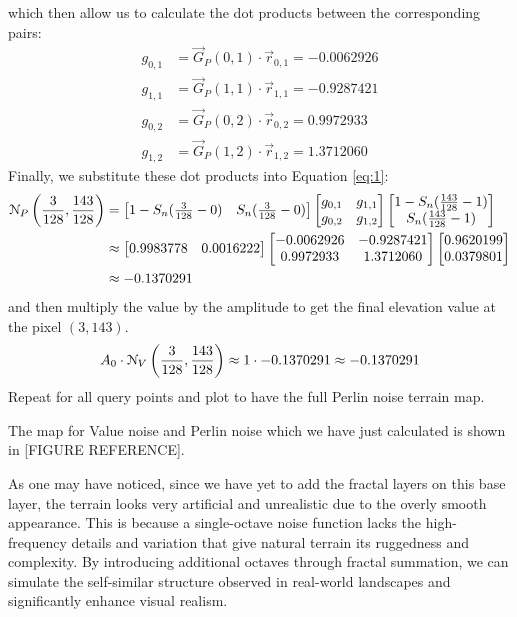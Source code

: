which then allow us to calculate the dot products between the corresponding pairs:
\begin{align*}
    g_{0,1}&=\vec{G}_P(0,1)\cdot\vec{r}_{0,1}=-0.0062926\\
    g_{1,1}&=\vec{G}_P(1,1)\cdot\vec{r}_{1,1}=-0.9287421\\
    g_{0,2}&=\vec{G}_P(0,2)\cdot\vec{r}_{0,2}=0.9972933\\
    g_{1,2}&=\vec{G}_P(1,2)\cdot\vec{r}_{1,2}=1.3712060
\end{align*}
Finally, we substitute these dot products into Equation \ref{eq:1}:
\begin{align*}
    \EuScript{N}_P\left(\frac{3}{128},\frac{143}{128}\right)&=
    \begin{bmatrix}
        1-S_n(\frac{3}{128}-0) & S_n(\frac{3}{128}-0)
    \end{bmatrix}
    \begin{bmatrix}
        g_{0,1} & g_{1,1}\\
        g_{0,2} & g_{1,2}
    \end{bmatrix}
    \begin{bmatrix}
        1-S_n(\frac{143}{128}-1)\\
        S_n(\frac{143}{128}-1)
    \end{bmatrix}\\
    &\approx
    \begin{bmatrix}
        0.9983778 & 0.0016222
    \end{bmatrix}
    \begin{bmatrix}
        -0.0062926 & -0.9287421\\
        0.9972933 & 1.3712060
    \end{bmatrix}
    \begin{bmatrix}
        0.9620199\\
        0.0379801
    \end{bmatrix}\\
    &\approx -0.1370291
\end{align*}
and then multiply the value by the amplitude to get the final elevation value at the pixel $(3,143)$.
\[A_0\cdot\EuScript{N}_V\left(\frac{3}{128},\frac{143}{128}\right)\approx1\cdot-0.1370291\approx-0.1370291\]
Repeat for all query points and plot to have the full Perlin noise terrain map.

The map for Value noise and Perlin noise which we have just calculated is shown in [FIGURE REFERENCE].

As one may have noticed, since we have yet to add the fractal layers on this base layer, the terrain looks very artificial and unrealistic due to 
the overly smooth appearance. This is because a single-octave noise function lacks the high-frequency details and variation that give natural terrain 
its ruggedness and complexity. By introducing additional octaves through fractal summation, we can simulate the self-similar structure observed in 
real-world landscapes and significantly enhance visual realism. 

